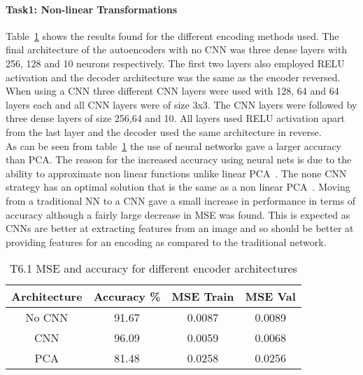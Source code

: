 \documentclass[10pt,twocolumn,letterpaper]{article}
\begin{document}
\paragraph{Task1: Non-linear Transformations}


Table~\ref*{table:t61} shows the results found for the different encoding methods used. The final architecture of the autoencoders with no CNN was three dense layers with 256, 128 and 10 neurons respectively. The first two layers also employed RELU activation and the decoder architecture was the same as the encoder reversed. When using a CNN three different CNN layers were used with 128, 64 and 64 layers each and all CNN layers were of size 3x3. The CNN layers were followed by three dense layers of size 256,64 and 10. All layers used RELU activation apart from the last layer and the decoder used the same architecture in reverse. \\
As can be seen from table~\ref*{table:t61} the use of neural networks gave a larger accuracy than PCA. The reason for the increased accuracy using neural nets is due to the ability to approximate non linear functions unlike linear PCA~\cite{pca}. The none CNN strategy has an optimal solution that is the same as a non linear PCA~\cite{pca}. Moving from a traditional NN to a CNN gave a small increase in performance in terms of accuracy although a fairly large decrease in MSE was found. This is expected as CNNs are better at extracting features from an image and so should be better at providing features for an encoding as compared to the traditional network.  

\begin{table}[ht]
    \small
    \centering
    \begin{tabular}{|c|c|c|c|}
        \hline
        Architecture     & Accuracy \% & MSE Train & MSE Val \\
        \hline
        No CNN & 91.67   & 0.0087 & 0.0089        \\
        CNN  & 96.09  & 0.0059 &   0.0068       \\
        PCA &  81.48  &  0.0258  &   0.0256   \\
        \hline
    \end{tabular}
    \medbreak
    \caption{T6.1 MSE and accuracy for different encoder architectures}
    \label{table:t61}
    \vspace{-0.8cm}
\end{table}
\end{document}

